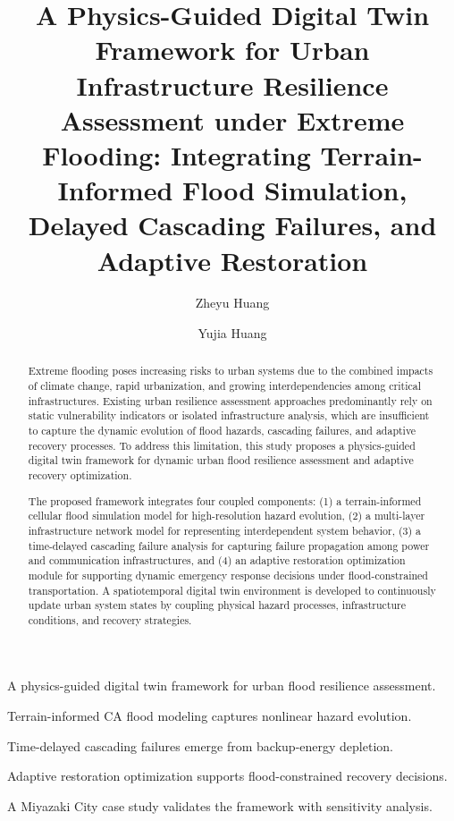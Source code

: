 \documentclass[preprint,12pt]{elsarticle}
\begin{document}
\begin{frontmatter}

\title{A Physics-Guided Digital Twin Framework for Urban Infrastructure
Resilience Assessment under Extreme Flooding: Integrating Terrain-Informed
Flood Simulation, Delayed Cascading Failures, and Adaptive Restoration}

\begin{highlights}
\item A physics-guided digital twin framework for urban flood resilience assessment.
\item Terrain-informed CA flood modeling captures nonlinear hazard evolution.
\item Time-delayed cascading failures emerge from backup-energy depletion.
\item Adaptive restoration optimization supports flood-constrained recovery decisions.
\item A Miyazaki City case study validates the framework with sensitivity analysis.
\end{highlights}

\author[aff1]{Zheyu Huang}
\author[aff1]{Yujia Huang}

\begin{abstract}
Extreme flooding poses increasing risks to urban systems due to the combined
impacts of climate change, rapid urbanization, and growing interdependencies
among critical infrastructures. Existing urban resilience assessment
approaches predominantly rely on static vulnerability indicators or isolated
infrastructure analysis, which are insufficient to capture the dynamic
evolution of flood hazards, cascading failures, and adaptive recovery
processes. To address this limitation, this study proposes a physics-guided
digital twin framework for dynamic urban flood resilience assessment and
adaptive recovery optimization.

The proposed framework integrates four coupled components: (1) a
terrain-informed cellular flood simulation model for high-resolution hazard
evolution, (2) a multi-layer infrastructure network model for representing
interdependent system behavior, (3) a time-delayed cascading failure analysis
for capturing failure propagation among power and communication
infrastructures, and (4) an adaptive restoration optimization module for
supporting dynamic emergency response decisions under flood-constrained
transportation. A spatiotemporal digital twin environment is developed to
continuously update urban system states by coupling physical hazard
processes, infrastructure conditions, and recovery strategies.


\end{abstract}
\end{frontmatter}
\end{document}
